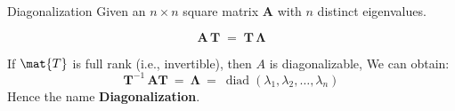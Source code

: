 \begin{frame}[t,fragile]{Diagonalization}
    Given an $n \times n$ square matrix $\mathbf{A}$ with $n$ distinct eigenvalues.

    \[
        \mathbf{A}\,\mathbf{T} \;=\; \mathbf{T}\,\mathbf{\Lambda}
    \]

    If $\mat{T}$ is full rank (i.e., invertible), then $A$ is diagonalizable, We can obtain:
    \[
        \mathbf{T}^{-1}\,\mathbf{A}\mathbf{T} \:=\: \mathbf{\Lambda}\:=\:\operatorname{diad}\left(\lambda_1,\lambda_2,\dots,\lambda_n\right)
    \]
    Hence the name \textbf{Diagonalization}.

\end{frame}

